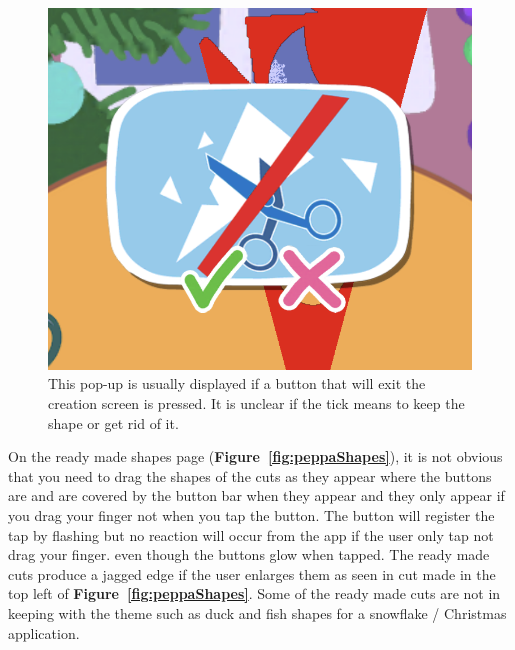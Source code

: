 \documentclass[11pt]{article}
\begin{document}
\begin{figure}[!ht]
\begin{minipage}{0.32\textwidth}
                            \includegraphics[width=0.8\linewidth]{Images/peppa/peppaPopUp.png}
                             \caption{This pop-up is usually displayed if a button that will exit the creation screen is pressed. It is unclear if the tick means to keep the shape or get rid of it.}
                            \label{fig:peppaPopUp}
                        \end{minipage}
                    \end{figure}
                    
                
                    On the ready made shapes page (\textbf{Figure~\ref{fig:peppaShapes}}), it is not obvious that you need to drag the shapes of the cuts as they appear where the buttons are and are covered by the button bar when they appear and they only appear if you drag your finger not when you tap the button. The button will register the tap by flashing but no reaction will occur from the app if the user only tap not drag your finger.  even though the buttons glow when tapped. The ready made cuts produce a jagged edge if the user enlarges them as seen in cut made in the top left of \textbf{Figure~\ref{fig:peppaShapes}}. Some of the ready made cuts are not in keeping with the theme such as duck and fish shapes for a snowflake / Christmas application. 
                
\end{document}
